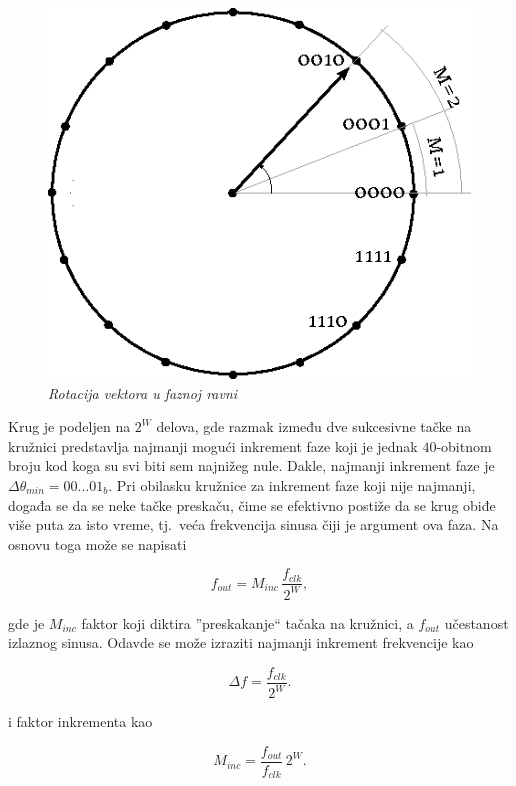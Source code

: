 \documentclass[conference]{IEEEtran}
\begin{document}
\begin{figure}[h]
	\centering
	\includegraphics[scale=0.6]{./slike/faznaravan.eps}
	\caption{\textsl{Rotacija vektora u faznoj ravni}}
	\label{slika:faznaravan}
\end{figure}

Krug je podeljen na $2^W$ delova, gde razmak između dve sukcesivne tačke na kružnici predstavlja najmanji mogući inkrement faze koji je jednak $40$-obitnom broju kod koga su svi biti sem najnižeg nule. Dakle, najmanji inkrement faze je $\Delta \theta_{min}=00\ldots01_b$. Pri obilasku kružnice za inkrement faze koji nije najmanji, događa se da se neke tačke preskaču, čime se efektivno postiže da se krug obiđe više puta za isto vreme, tj.~veća frekvencija sinusa čiji je argument ova faza. Na osnovu toga može se napisati

\begin{equation}
f_{out} = M_{inc}\,\frac{f_{clk}}{2^W} ,
\end{equation}

\noindent gde je $M_{inc}$ faktor koji diktira ''preskakanje`` tačaka na kružnici, a $f_{out}$ učestanost izlaznog sinusa. Odavde se može izraziti najmanji inkrement frekvencije kao

\begin{equation}
\Delta f = \frac{f_{clk}}{2^W} .
\end{equation}

\noindent i faktor inkrementa kao

\begin{equation}
M_{inc} = \frac{f_{out}}{f_{clk}}\,2^W .
\end{equation}
\end{document}
